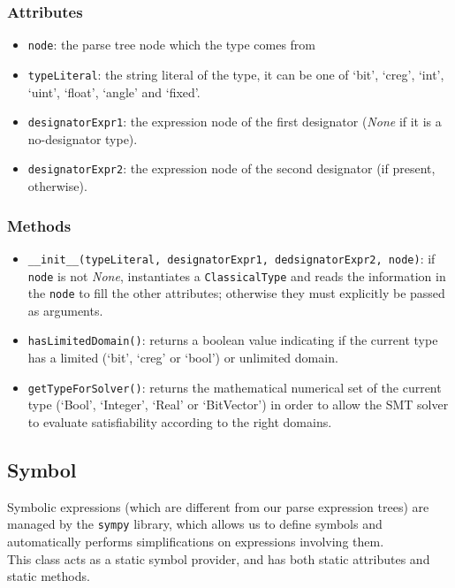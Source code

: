 \documentclass[12pt,a4paper]{report}
\theoremstyle{definition}
\theoremstyle{definition}
\theoremstyle{definition}
\begin{document}
\subsubsection{Attributes}
\begin{itemize}
    \itemsep 0em
    \item \texttt{node}: the parse tree node which the type comes from
    \item \texttt{typeLiteral}: the string literal of the type, it can be one of `bit', `creg', `int', `uint', `float', `angle' and `fixed'.
    \item \texttt{designatorExpr1}: the expression node of the first designator (\textit{None} if it is a no-designator type).
    \item \texttt{designatorExpr2}: the expression node of the second designator (if present,  otherwise).
\end{itemize}
\subsubsection{Methods}
\begin{itemize}
    \itemsep 0em
    \item \texttt{\_\_init\_\_(typeLiteral, designatorExpr1, dedsignatorExpr2, node)}: if \texttt{node} is not \textit{None}, instantiates a \texttt{ClassicalType} and reads the information in the \texttt{node} to fill the other attributes; otherwise they must explicitly be passed as arguments.
    \item \texttt{hasLimitedDomain()}: returns a boolean value indicating if the current type has a limited (`bit', `creg' or `bool') or unlimited domain.
    \item \texttt{getTypeForSolver()}: returns the mathematical numerical set of the current type (`Bool', `Integer', `Real' or `BitVector') in order to allow the SMT solver to evaluate satisfiability according to the right domains.
\end{itemize}

\subsection{Symbol}
Symbolic expressions (which are different from our parse expression trees) are managed by the \texttt{sympy} library, which allows us to define symbols and automatically performs simplifications on expressions involving them.\\
This class acts as a static symbol provider, and has both static attributes and static methods.
\end{document}
